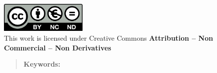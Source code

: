 \documentclass[12pt]{report} %
\begin{document}
\begin{titlepage}
\begin{sffamily}
	\noindent\includegraphics[width=4.2cm]{creativecommons.png}\\ %
    \footnotesize{This work is licensed under Creative Commons \textbf{Attribution – Non Commercial – Non Derivatives}}
	
	\end{sffamily}
\end{titlepage}

\newpage %
\thispagestyle{empty}
\mbox{}

\newpage %
\thispagestyle{empty}
\mbox{}

\renewcommand\abstractname{\large\bfseries\filcenter\uppercase{Summary}}
\begin{abstract}
\thispagestyle{plain}
\setcounter{page}{3}
	
	
	\textbf{Keywords:} %
	
	\vfill
\end{abstract}
	\newpage %
	\thispagestyle{empty}
	\mbox{}



\setcounter{page}{5}
	
		
	\vfill
	
	\newpage %
	\thispagestyle{empty}
	\mbox{}
	


\tableofcontents
\thispagestyle{fancy}

\newpage %
\thispagestyle{empty}
\mbox{}

\listoffigures
\thispagestyle{fancy}

\newpage %
\thispagestyle{empty}
\mbox{}

\listoftables
\thispagestyle{fancy}
\end{document}
